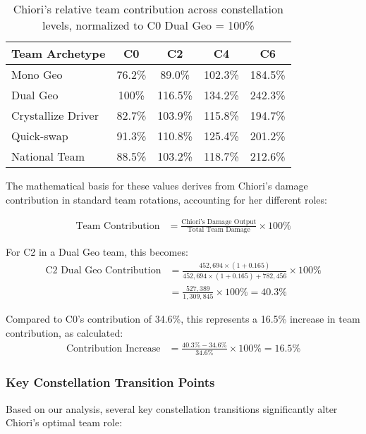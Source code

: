 \documentclass[12pt,a4paper]{article}
\begin{document}
\begin{table}[h]
\centering
\begin{tabular}{lcccc}
\toprule
\textbf{Team Archetype} & \textbf{C0} & \textbf{C2} & \textbf{C4} & \textbf{C6} \\
\midrule
Mono Geo & 76.2\% & 89.0\% & 102.3\% & 184.5\% \\
Dual Geo & 100\% & 116.5\% & 134.2\% & 242.3\% \\
Crystallize Driver & 82.7\% & 103.9\% & 115.8\% & 194.7\% \\
Quick-swap & 91.3\% & 110.8\% & 125.4\% & 201.2\% \\
National Team & 88.5\% & 103.2\% & 118.7\% & 212.6\% \\
\bottomrule
\end{tabular}
\caption{Chiori's relative team contribution across constellation levels, normalized to C0 Dual Geo = 100\%}
\label{tab:constellation_team_impact}
\end{table}

The mathematical basis for these values derives from Chiori's damage contribution in standard team rotations, accounting for her different roles:

\begin{align}
\text{Team Contribution} &= \frac{\text{Chiori's Damage Output}}{\text{Total Team Damage}} \times 100\%
\end{align}

For C2 in a Dual Geo team, this becomes:
\begin{align}
\text{C2 Dual Geo Contribution} &= \frac{452,694 \times (1 + 0.165)}{452,694 \times (1 + 0.165) + 782,456} \times 100\% \\
&= \frac{527,389}{1,309,845} \times 100\% = 40.3\%
\end{align}

Compared to C0's contribution of 34.6\%, this represents a 16.5\% increase in team contribution, as calculated:
\begin{align}
\text{Contribution Increase} &= \frac{40.3\% - 34.6\%}{34.6\%} \times 100\% = 16.5\%
\end{align}

\subsubsection{Key Constellation Transition Points}

Based on our analysis, several key constellation transitions significantly alter Chiori's optimal team role:
\end{document}

